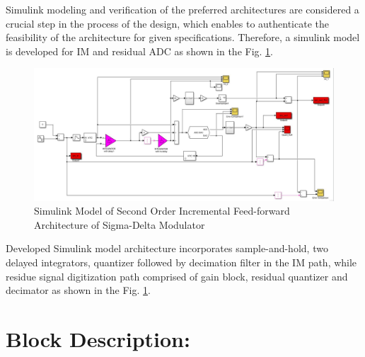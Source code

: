 Simulink modeling and verification of the preferred architectures are considered a crucial step in the process of the design, which enables to authenticate the feasibility of the architecture for given specifications. Therefore, a simulink model is developed for I{\textSigma}{\textDelta}M and residual ADC as shown in the Fig. \ref{SIM_ERISDM}.
\begin{figure}[h]
\centering
\includegraphics[width=\columnwidth]{Chap04/Figures/simulink_model_snapshot.jpg}
\caption{Simulink Model of Second Order Incremental Feed-forward Architecture of Sigma-Delta Modulator}
\label{SIM_ERISDM}
\end{figure}
Developed Simulink model architecture incorporates sample-and-hold, two delayed integrators, quantizer followed by decimation filter in the I{\textSigma}{\textDelta}M path, while residue signal digitization path comprised of gain block, residual quantizer and decimator as shown in the Fig. \ref{SIM_ERISDM}.
\section{Block Description:}
